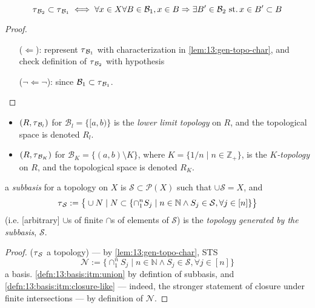 \begin{lem}\label{lem:13.3}\label{lem:13:gen-topo-comp}
  \[
  \operatorname{\tau}_{\mathcal B_2}\subset\operatorname{\tau}_{\mathcal B_1} \iff
  \forall x\in X \forall B\in\mathcal B_1,
  x\in B\Rightarrow \exists B'\in\mathcal B_2
  \operatorname{\,st.} x\in B'\subset B
  \]
\end{lem}
\begin{proof}
  \begin{itemize}
  \item[($\Leftarrow$):] represent $\operatorname{\tau}_{\mathcal B_1}$
    with characterization in \ref{lem:13:gen-topo-char},
    and check definition of $\operatorname{\tau}_{\mathcal B_2}$ with hypothesis
  \item[($\lnot\Leftarrow\lnot$):]
    since $\mathcal B_1\subset \operatorname{\tau}_{\mathcal B_1}$.
  \end{itemize}
\end{proof}

\begin{defn}
  \begin{itemize}
  \item
    $(R,\operatorname{\tau}_{\mathcal B_l})$ for $\mathcal B_l=\{[a, b)\}$
    is the \emph{lower limit topology} on $R$, and
    the topological space is denoted $R_l$.
  \item
    $(R,\operatorname{\tau}_{\mathcal B_K})$ for $\mathcal B_K=\{(a, b)\setminus K\}$,
    where $K=\{1/n\mid n\in\mathbb Z_+\}$,
    is the \emph{$K$-topology} on $R$, and
    the topological space is denoted $R_K$.
  \end{itemize}
\end{defn}

\begin{defn}
  a \emph{subbasis} for a topology on $X$ is
  $\mathcal S\subset\mathscr P(X)$ such that $\cup\mathcal S = X$,
  and
  \[
  \operatorname{\tau}_{\mathcal S} := \big\{ \cup N\mid
  N\subset\{\cap_1^n S_j\mid n\in\mathbb N \land
  S_j\in\mathcal S,\forall j\in [n]\}
  \big\}
  \]
  (i.e. [arbitrary] $\cup$s of finite $\cap$s
  of elements of $\mathcal S$)
  is the \emph{topology generated by the subbasis}, $\mathcal S$.
\end{defn}
\begin{proof} ($\operatorname{\tau}_{\mathcal S}$ a topology) ---
  by \ref{lem:13:gen-topo-char}, STS
  \[
  \mathcal N := \{\cap_1^n S_j\mid n\in\mathbb N \land
  S_j\in\mathcal S,\forall j\in [n]\}
  \]
  a basis. \ref{defn:13:basis:itm:union} by defintion of subbasis,
  and \ref{defn:13:basis:itm:closure-like} --- indeed,
  the stronger statement of closure under finite intersections ---
  by definition of $\mathcal N$.
\end{proof}
